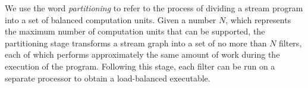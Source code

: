 We use the word {\it partitioning} to refer to the process of dividing
a stream program into a set of balanced computation units.  Given a
number $N$, which represents the maximum number of computation units
that can be supported, the partitioning stage transforms a stream
graph into a set of no more than $N$ filters, each of which performs
approximately the same amount of work during the execution of the
program.  Following this stage, each filter can be run on a separate
processor to obtain a load-balanced executable.



